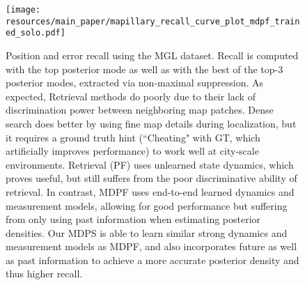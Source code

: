         
        \begin{figure}[t]
            \centering
            \texttt{[image: resources/main\_paper/mapillary\_recall\_curve\_plot\_mdpf\_trained\_solo.pdf]}
            \vskip -0.05in
            \caption{\small{Position and error recall using the MGL \cite{sarlin2023orienternet} dataset. Recall is computed with the top posterior mode as well as with the best of the top-3 posterior modes, extracted via non-maximal suppression. As expected, Retrieval \cite{noe2020eccv} methods do poorly due to their lack of discrimination power between neighboring map patches. Dense search \cite{sarlin2023orienternet} does better by using fine map details during localization, but it requires a ground truth hint (``Cheating" with GT, which artificially improves performance) to work well at city-scale environments.  Retrieval (PF) \cite{9635972GausePF} uses unlearned state dynamics, which proves useful, but still suffers from the poor discriminative ability of retrieval. In contrast, MDPF \cite{younis2023mdpf} uses end-to-end learned dynamics and measurement models, allowing for good performance but suffering from only using  past information when estimating posterior densities.  Our MDPS is able to learn similar strong dynamics and measurement models as MDPF, and also incorporates future as well as past information to achieve a more accurate posterior density and thus higher recall.}}
            \label{fig:mapillary_recall_curves}
            \vskip -0.1in
        \end{figure}


        


        
        
        
        

        

    
        
        